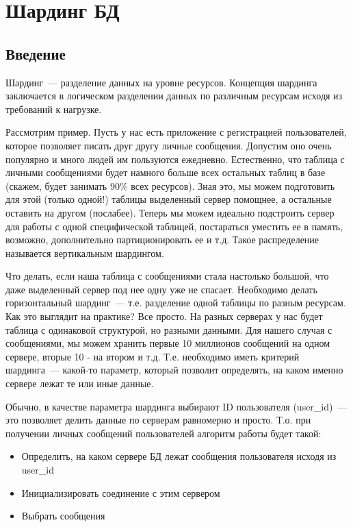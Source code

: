 \chapter{Шардинг БД}
\begin{epigraphs}
\end{epigraphs}
\section{Введение}
Шардинг~--- разделение данных на уровне ресурсов. Концепция шардинга заключается в логическом разделении данных по различным 
ресурсам исходя из требований к нагрузке.

Рассмотрим пример. Пусть у нас есть приложение с регистрацией пользователей, которое позволяет писать друг другу 
личные сообщения. Допустим оно очень популярно и много людей им пользуются ежедневно. Естественно, что таблица с личными 
сообщениями будет намного больше всех остальных таблиц в базе (скажем, будет занимать 90\% всех ресурсов). Зная это, 
мы можем подготовить для этой (только одной!) таблицы выделенный сервер помощнее, а остальные оставить на другом (послабее). 
Теперь мы можем идеально подстроить сервер для работы с одной специфической таблицей, постараться уместить ее в память, возможно, 
дополнительно партиционировать ее и т.д. Такое распределение называется вертикальным шардингом.

Что делать, если наша таблица с сообщениями стала настолько большой, что даже выделенный сервер под нее одну уже не спасает. 
Необходимо делать горизонтальный шардинг~--- т.е. разделение одной таблицы по разным ресурсам. Как это выглядит на практике? 
Все просто. На разных серверах у нас будет таблица с одинаковой структурой, но разными данными. Для нашего случая с сообщениями, 
мы можем хранить первые 10 миллионов сообщений на одном сервере, вторые 10 - на втором и т.д. Т.е. необходимо иметь критерий 
шардинга~--- какой-то параметр, который позволит определять, на каком именно сервере лежат те или иные данные.

Обычно, в качестве параметра шардинга выбирают ID пользователя (user\_id)~--- это позволяет делить данные по серверам равномерно 
и просто. Т.о. при получении личных сообщений пользователей алгоритм работы будет такой:
\begin{itemize}
\item Определить, на каком сервере БД лежат сообщения пользователя исходя из user\_id
\item Инициализировать соединение с этим сервером
\item Выбрать сообщения
\end{itemize}

